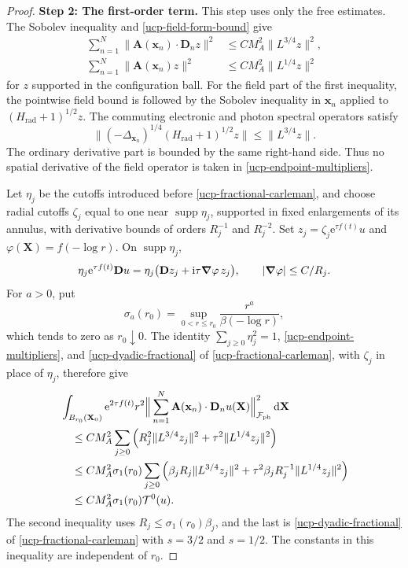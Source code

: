 \documentclass[final,reqno]{amsart}
\DeclareMathOperator{\supp}{supp}
\theoremstyle{remark}
\renewcommand{\i}{\mathrm{i}}
\newcommand{\e}{\mathrm{e}}
\newcommand{\ph}{\mathrm{ph}}
\newcommand{\rad}{\mathrm{rad}}
\newcommand{\Fock}{\mathcal{F}}
\let\phi=\varphi
\newcommand{\vx}{\mathbf{x}}
\newcommand{\vA}{{\mathbf{A}}}
\newcommand{\vX}{{\mathbf{X}}}
\newcommand{\vD}{{\mathbf{D}}}
\begin{document}
\begin{proof}
\noindent\textbf{Step 2: The first-order term.}
This step uses only the free estimates.
The Sobolev inequality and \cref{ucp-field-form-bound} give
\begin{equation}\label{ucp-endpoint-multipliers}
 \begin{split}
 \sum_{n=1}^N\|\vA(\vx_n)\cdot\vD_nz\|^2
       &\leq C M_A^2\|L^{3/4}z\|^2,\\
 \sum_{n=1}^N\|\vA(\vx_n)z\|^2
       &\leq C M_A^2\|L^{1/4}z\|^2
 \end{split}
\end{equation}
for $z$ supported in the configuration ball.  For the field part of
the first inequality, the pointwise field bound is followed by
the Sobolev inequality in $\vx_n$ applied to $(H_\rad+1)^{1/2}z$.
The commuting electronic and photon spectral operators satisfy
\[
 \|(-\Delta_{\vx_n})^{1/4}(H_\rad+1)^{1/2}z\|
       \leq\|L^{3/4}z\|.
\]
The ordinary derivative part is bounded by the same right-hand side.
Thus no spatial derivative of the field operator is taken in
\cref{ucp-endpoint-multipliers}.

Let $\eta_j$ be the cutoffs introduced before
\cref{ucp-fractional-carleman}, and choose radial cutoffs $\zeta_j$
equal to one near $\supp\eta_j$, supported in fixed enlargements of
its annulus, with derivative bounds of orders
$R_j^{-1}$ and $R_j^{-2}$.  Set
$z_j=\zeta_j\e^{\tau f(t)}u$ and $\phi(\vX)=f(-\log r)$.
On $\supp\eta_j$,
\[
 \eta_j\e^{\tau f(t)}\vD u
   =\eta_j\big(\vD z_j+\i\tau\grad\phi\,z_j\big),\qquad
 |\grad\phi|\leq C/R_j.
\]
For $a>0$, put
\[
 \sigma_a(r_0)=\sup_{0<r\leq r_0}
                \frac{r^a}{\beta(-\log r)},
\]
which tends to zero as $r_0\downarrow0$.
The identity $\sum_{j\geq0}\eta_j^2=1$, \cref{ucp-endpoint-multipliers}, and
\cref{ucp-dyadic-fractional} of \cref{ucp-fractional-carleman}, with $\zeta_j$ in place of $\eta_j$,
therefore give
\begin{align}
 &\int_{B_{r_0}(\vX_0)}\e^{2\tau f(t)}r^2
                       \Big\|\sum_{n=1}^N\vA(\vx_n)\cdot\vD_nu(\vX)\Big\|_{\Fock_\ph}^2\dd\vX\notag\\
 &\quad\leq C M_A^2\sum_{j\geq0}\left(
               R_j^2\|L^{3/4}z_j\|^2
                    +\tau^2\|L^{1/4}z_j\|^2\right)\notag\\
 &\quad\leq C M_A^2\sigma_1(r_0)\sum_{j\geq0}\left(
               \beta_jR_j\|L^{3/4}z_j\|^2
                    +\tau^2\beta_jR_j^{-1}\|L^{1/4}z_j\|^2\right)\notag\\
 &\quad\leq C M_A^2\sigma_1(r_0)\mathcal T^0(u).
 \label{ucp-endpoint-first-order}
\end{align}
The second inequality uses $R_j\leq\sigma_1(r_0)\beta_j$, and the last
is \cref{ucp-dyadic-fractional} of \cref{ucp-fractional-carleman} with $s=3/2$ and $s=1/2$.  The
constants in this inequality are independent of $r_0$.


\end{proof}
\end{document}
